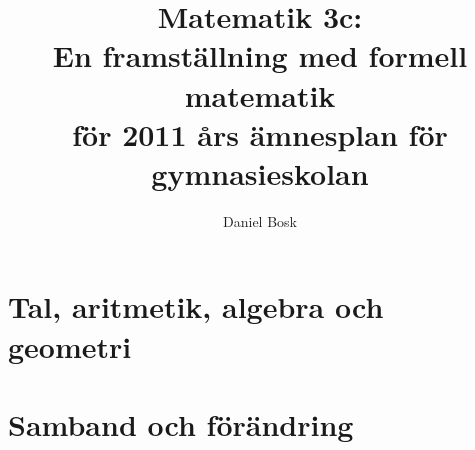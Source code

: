 \documentclass[a4paper,titlepage,reqno,final,twoside]{amsbook}
\theoremstyle{definition}
\theoremstyle{remark}
\numberwithin{section}{chapter}
\numberwithin{equation}{chapter}
\begin{document}

\title[Matematik 3c]{
  Matematik 3c:\\
  En framställning med formell matematik\\
  för 2011 års ämnesplan för gymnasieskolan
}
\author{Daniel Bosk}

\frontmatter



\mainmatter
\ifdraft{
  \doublespacing
}{}

\part{Tal, aritmetik, algebra och geometri}



\part{Samband och förändring}








\appendix
\ifdraft{
  \doublespacing
}{}
%

\backmatter
\ifdraft{
  \singlespacing
}{}


\clearpage
\end{document}
